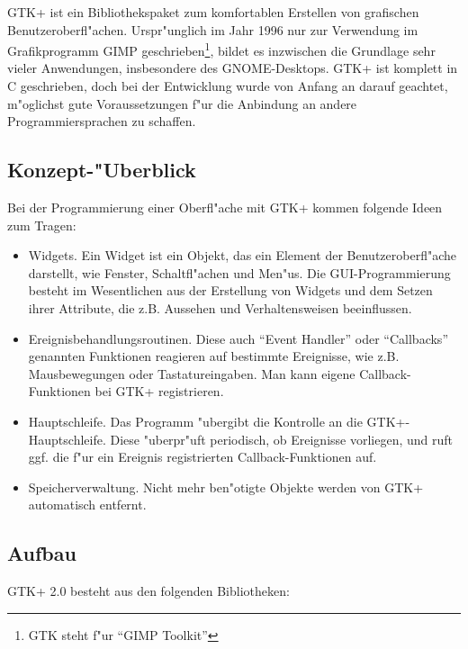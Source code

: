 \documentclass{article}
\begin{document}
GTK+ ist ein Bibliothekspaket zum komfortablen Erstellen von grafischen
Benutzeroberfl"achen. Urspr"unglich im Jahr 1996 nur zur Verwendung im
Grafikprogramm GIMP geschrieben\footnote{GTK steht f"ur ``GIMP Toolkit''}, 
bildet es
inzwischen die Grundlage sehr vieler Anwendungen, insbesondere des 
GNOME-Desktops. GTK+ ist komplett
in C geschrieben, doch bei der Entwicklung wurde von Anfang an darauf geachtet,
m"oglichst gute Voraussetzungen f"ur die Anbindung an andere
Programmiersprachen zu schaffen.

\subsection*{Konzept-"Uberblick}

Bei der Programmierung einer Oberfl"ache mit GTK+ kommen folgende Ideen
zum Tragen:

\begin{itemize}
\item Widgets.
      Ein Widget ist ein Objekt, das ein
      Element der Benutzeroberfl"ache darstellt, wie
      Fenster, Schaltfl"achen und Men"us.
      Die GUI-Programmierung besteht im Wesentlichen aus der
      Erstellung von Widgets und dem Setzen ihrer Attribute, die
      z.B. Aussehen und Verhaltensweisen beeinflussen.

\item Ereignisbehandlungsroutinen. Diese auch ``Event Handler'' oder
      ``Callbacks'' genannten Funktionen reagieren auf bestimmte Ereignisse, 
      wie z.B. Mausbewegungen oder Tastatureingaben. Man kann eigene
      Callback-Funktionen bei GTK+ registrieren.

\item Hauptschleife. Das Programm "ubergibt die Kontrolle an die
      GTK+-Hauptschleife. Diese "uberpr"uft periodisch, ob Ereignisse
      vorliegen,
      und ruft ggf. die f"ur ein Ereignis registrierten Callback-Funktionen
      auf.

\item Speicherverwaltung. Nicht mehr ben"otigte Objekte werden von
      GTK+ automatisch entfernt.

\end{itemize}

\subsection*{Aufbau}

GTK+ 2.0 besteht aus den folgenden Bibliotheken:
\end{document}
